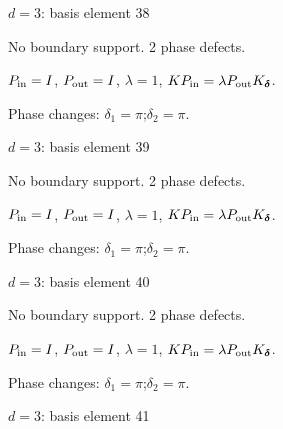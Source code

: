 \vfill
{\footnotesize\texttt{}}
\newpage
{}
{\Large $d=3$: basis element 38}\par
No boundary support. 2 phase defects.
\begin{center}
\end{center}
\vspace{-1mm}
$P_{\rm in}=I$, \quad $P_{\rm out}=I$, \quad $\lambda=1$, \qquad $K P_{\rm in}=\lambda P_{\rm out}K_{\boldsymbol\delta}$.
\par\smallskip\begin{minipage}{.98\linewidth}\small Phase changes: $\delta_{1}=\pi$;\quad $\delta_{2}=\pi$.\end{minipage}
\vfill
{\footnotesize\texttt{}}
\newpage
{}
{\Large $d=3$: basis element 39}\par
No boundary support. 2 phase defects.
\begin{center}
\end{center}
\vspace{-1mm}
$P_{\rm in}=I$, \quad $P_{\rm out}=I$, \quad $\lambda=1$, \qquad $K P_{\rm in}=\lambda P_{\rm out}K_{\boldsymbol\delta}$.
\par\smallskip\begin{minipage}{.98\linewidth}\small Phase changes: $\delta_{1}=\pi$;\quad $\delta_{2}=\pi$.\end{minipage}
\vfill
{\footnotesize\texttt{}}
\newpage
{}
{\Large $d=3$: basis element 40}\par
No boundary support. 2 phase defects.
\begin{center}
\end{center}
\vspace{-1mm}
$P_{\rm in}=I$, \quad $P_{\rm out}=I$, \quad $\lambda=1$, \qquad $K P_{\rm in}=\lambda P_{\rm out}K_{\boldsymbol\delta}$.
\par\smallskip\begin{minipage}{.98\linewidth}\small Phase changes: $\delta_{1}=\pi$;\quad $\delta_{2}=\pi$.\end{minipage}
\vfill
{\footnotesize\texttt{}}
\newpage
{}
{\Large $d=3$: basis element 41}\par
